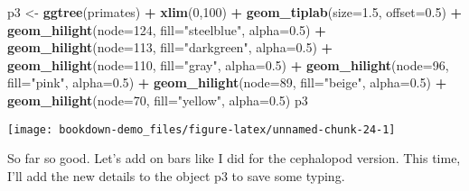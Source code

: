 \documentclass[]{book}
\newenvironment{Shaded}{\begin{snugshade}}{\end{snugshade}}
\newcommand{\KeywordTok}[1]{\textcolor[rgb]{0.13,0.29,0.53}{\textbf{#1}}}
\newcommand{\DataTypeTok}[1]{\textcolor[rgb]{0.13,0.29,0.53}{#1}}
\newcommand{\DecValTok}[1]{\textcolor[rgb]{0.00,0.00,0.81}{#1}}
\newcommand{\FloatTok}[1]{\textcolor[rgb]{0.00,0.00,0.81}{#1}}
\newcommand{\StringTok}[1]{\textcolor[rgb]{0.31,0.60,0.02}{#1}}
\newcommand{\OperatorTok}[1]{\textcolor[rgb]{0.81,0.36,0.00}{\textbf{#1}}}
\newcommand{\NormalTok}[1]{#1}
\begin{document}
\begin{Shaded}
\begin{Highlighting}[]
\NormalTok{p3 <-}\StringTok{ }\KeywordTok{ggtree}\NormalTok{(primates) }\OperatorTok{+}
\StringTok{  }\KeywordTok{xlim}\NormalTok{(}\DecValTok{0}\NormalTok{,}\DecValTok{100}\NormalTok{) }\OperatorTok{+}
\StringTok{  }\KeywordTok{geom_tiplab}\NormalTok{(}\DataTypeTok{size=}\FloatTok{1.5}\NormalTok{, }\DataTypeTok{offset=}\FloatTok{0.5}\NormalTok{) }\OperatorTok{+}
\StringTok{  }\KeywordTok{geom_hilight}\NormalTok{(}\DataTypeTok{node=}\DecValTok{124}\NormalTok{, }\DataTypeTok{fill=}\StringTok{"steelblue"}\NormalTok{, }\DataTypeTok{alpha=}\FloatTok{0.5}\NormalTok{) }\OperatorTok{+}
\StringTok{  }\KeywordTok{geom_hilight}\NormalTok{(}\DataTypeTok{node=}\DecValTok{113}\NormalTok{, }\DataTypeTok{fill=}\StringTok{"darkgreen"}\NormalTok{, }\DataTypeTok{alpha=}\FloatTok{0.5}\NormalTok{) }\OperatorTok{+}
\StringTok{  }\KeywordTok{geom_hilight}\NormalTok{(}\DataTypeTok{node=}\DecValTok{110}\NormalTok{, }\DataTypeTok{fill=}\StringTok{"gray"}\NormalTok{, }\DataTypeTok{alpha=}\FloatTok{0.5}\NormalTok{) }\OperatorTok{+}
\StringTok{  }\KeywordTok{geom_hilight}\NormalTok{(}\DataTypeTok{node=}\DecValTok{96}\NormalTok{, }\DataTypeTok{fill=}\StringTok{"pink"}\NormalTok{, }\DataTypeTok{alpha=}\FloatTok{0.5}\NormalTok{) }\OperatorTok{+}
\StringTok{  }\KeywordTok{geom_hilight}\NormalTok{(}\DataTypeTok{node=}\DecValTok{89}\NormalTok{, }\DataTypeTok{fill=}\StringTok{"beige"}\NormalTok{, }\DataTypeTok{alpha=}\FloatTok{0.5}\NormalTok{) }\OperatorTok{+}
\StringTok{  }\KeywordTok{geom_hilight}\NormalTok{(}\DataTypeTok{node=}\DecValTok{70}\NormalTok{, }\DataTypeTok{fill=}\StringTok{"yellow"}\NormalTok{, }\DataTypeTok{alpha=}\FloatTok{0.5}\NormalTok{) }
\NormalTok{p3}
\end{Highlighting}
\end{Shaded}

\begin{center}\texttt{[image: bookdown-demo\_files/figure-latex/unnamed-chunk-24-1]} \end{center}

So far so good. Let's add on bars like I did for the cephalopod version.
This time, I'll add the new details to the object p3 to save some
typing.
\end{document}
